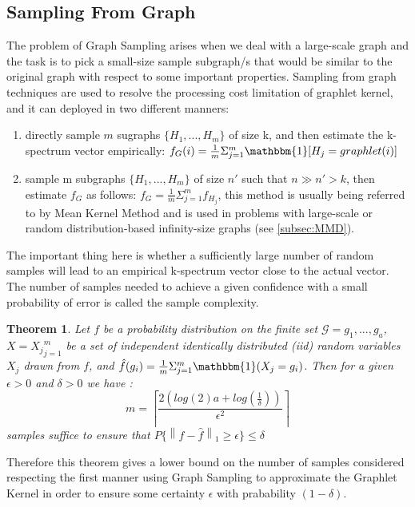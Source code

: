 \subsection{Sampling From Graph}
\label{graph_sampling}
The problem of Graph Sampling arises when we deal with a large-scale graph and the task is to pick a small-size sample subgraph/s that would be similar to the original graph with respect to some important properties.\newline
Sampling from graph techniques are used to resolve the processing cost limitation of graphlet kernel, and it can deployed in two different manners:
\begin{enumerate} \itemsep0pt \parskip0pt 
    \item directly sample $m$ sugraphs $\{H_1,...,H_m\}$ of size k, and then estimate the k-spectrum vector empirically:
    $f_G(i)=\frac{1}{m}\Sigma_{j=1}^m \mathbbm{1}[H_j=graphlet(i)]$
    \item sample m subgraphs  $\{H_1,...,H_m\}$ of size $n'$ such that $n\gg n'>k$, then estimate $f_G$ as follows:
    $f_G=\frac{1}{m}\Sigma_{j=1}^m f_{H_j}$, this method is usually being referred to by Mean Kernel Method and is used in problems with large-scale or random distribution-based infinity-size graphs (see \ref{subsec:MMD}).
\end{enumerate}  
The important thing here is whether a sufficiently large number of random samples will lead to an empirical k-spectrum vector close to the actual vector. The number of samples needed to achieve a given confidence with a small probability of error is called the sample complexity. 
\newtheorem{theorem}{Theorem} 
\begin{theorem}
Let $f$ be a probability distribution on the
finite set $\mathcal{G}={g_1,...,g_a}$, $X={X_j}_{j=1}^m$ be a set of independent identically distributed (iid) random variables $X_j$ drawn from $f$, and $\hat{f}(g_i)=\frac{1}{m}\Sigma_{j=1}^m\mathbbm{1}(X_j=g_i)$. Then for a given $\epsilon>0$ and $\delta >0$ we have \citep{graphlet_kernel}:
\begin{equation}
m=\left \lceil \frac{2(log(2)a+log(\frac{1}{\delta} ))}{\epsilon^2} \right \rceil
\end{equation}
samples suffice to ensure that $P\{\left\| f-\hat{f} \right\|_1 \geq \epsilon \}\leq\delta$
\end{theorem}
Therefore this theorem gives a lower bound on the number of samples considered respecting the first manner using Graph Sampling to approximate the Graphlet Kernel in order to ensure some certainty $\epsilon$ with prabability $(1-\delta)$.
